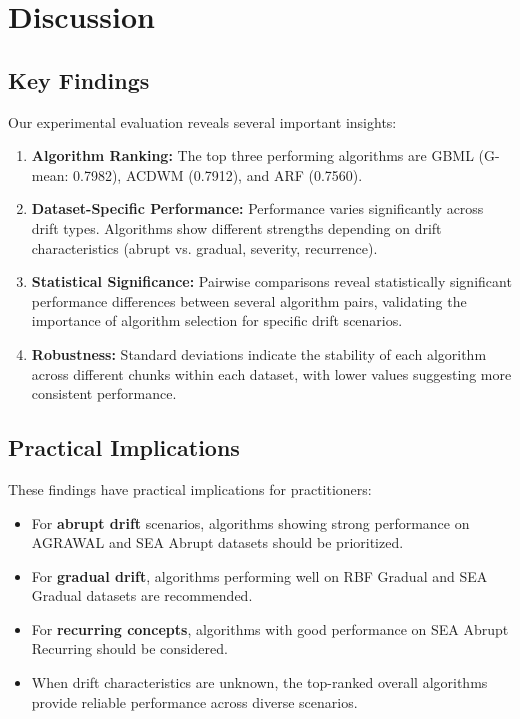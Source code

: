 \documentclass[conference]{IEEEtran}
\begin{document}
\section{Discussion}

\subsection{Key Findings}

Our experimental evaluation reveals several important insights:

\begin{enumerate}
\item \textbf{Algorithm Ranking:} The top three performing algorithms are GBML (G-mean: 0.7982), ACDWM (0.7912), and ARF (0.7560).


\item \textbf{Dataset-Specific Performance:} Performance varies significantly across drift types. Algorithms show different strengths depending on drift characteristics (abrupt vs. gradual, severity, recurrence).

\item \textbf{Statistical Significance:} Pairwise comparisons reveal statistically significant performance differences between several algorithm pairs, validating the importance of algorithm selection for specific drift scenarios.

\item \textbf{Robustness:} Standard deviations indicate the stability of each algorithm across different chunks within each dataset, with lower values suggesting more consistent performance.
\end{enumerate}

\subsection{Practical Implications}

These findings have practical implications for practitioners:

\begin{itemize}
\item For \textbf{abrupt drift} scenarios, algorithms showing strong performance on AGRAWAL and SEA Abrupt datasets should be prioritized.
\item For \textbf{gradual drift}, algorithms performing well on RBF Gradual and SEA Gradual datasets are recommended.
\item For \textbf{recurring concepts}, algorithms with good performance on SEA Abrupt Recurring should be considered.
\item When drift characteristics are unknown, the top-ranked overall algorithms provide reliable performance across diverse scenarios.
\end{itemize}
\end{document}
